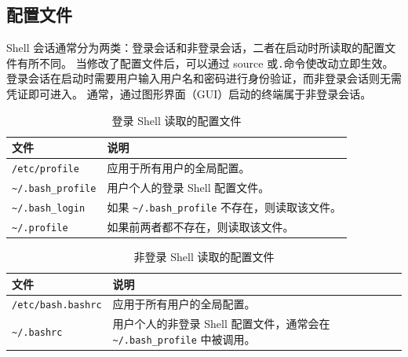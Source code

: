 \subsection{配置文件}
Shell 会话通常分为两类：登录会话和非登录会话，二者在启动时所读取的配置文件有所不同。
当修改了配置文件后，可以通过 source 或\verb|.|命令使改动立即生效。
登录会话在启动时需要用户输入用户名和密码进行身份验证，而非登录会话则无需凭证即可进入。
通常，通过图形界面（GUI）启动的终端属于非登录会话。
\begin{table}[H]
	\centering
	\begin{tabular}{|l|l|}
		\hline
		\textbf{文件}            & \textbf{说明}                           \\
		\hline
		\verb|/etc/profile|    & 应用于所有用户的全局配置。                         \\
		\hline
		\verb|~/.bash_profile| & 用户个人的登录 Shell 配置文件。                   \\
		\hline
		\verb|~/.bash_login|   & 如果 \verb|~/.bash_profile| 不存在，则读取该文件。 \\
		\hline
		\verb|~/.profile|      & 如果前两者都不存在，则读取该文件。                     \\
		\hline
	\end{tabular}
	\caption{登录 Shell 读取的配置文件}
\end{table}

\begin{table}[H]
	\centering
	\begin{tabular}{|l|p{6cm}|}
		\hline
		\textbf{文件}             & \textbf{说明}                                           \\
		\hline
		\verb|/etc/bash.bashrc| & 应用于所有用户的全局配置。                                         \\
		\hline
		\verb|~/.bashrc|        & 用户个人的非登录 Shell 配置文件，通常会在 \verb|~/.bash_profile| 中被调用。 \\
		\hline
	\end{tabular}
	\caption{非登录 Shell 读取的配置文件}
\end{table}
